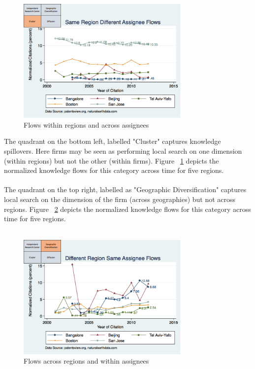 \documentclass[12pt]{article}
\begin{document}
\begin{figure}[h]
\begin{centering}
  \includegraphics[width=0.75\textwidth]{SMSSameRegionDiffAssigneeFlows}
  \caption{Flows within regions and across assignees}
  \label{fig:SMSSameRegionDiffAssigneeFlows}
\end{centering}
\end{figure}
The quadrant on the bottom left, labelled "Cluster" captures knowledge spillovers. Here firms may be seen as performing local search on one dimension (within regions) but not the other (within firms). Figure ~\ref{fig:SMSSameRegionDiffAssigneeFlows} depicts the normalized knowledge flows for this category across time for five regions.
\\\\
The quadrant on the top right, labelled as "Geographic Diversification" captures local search on the dimension of the firm (across geographies) but not across regions. Figure ~\ref{fig:SMSDiffRegionSameAssigneeFlows} depicts the normalized knowledge flows for this category across time for five regions.
\\\\
\begin{figure}[h]
\begin{centering}
  \includegraphics[width=0.75\textwidth]{SMSDiffRegionSameAssigneeFlows}
  \caption{Flows across regions and within assignees}
  \label{fig:SMSDiffRegionSameAssigneeFlows}
\end{centering}
\end{figure}
\end{document}
